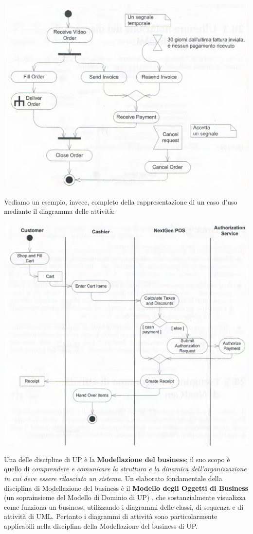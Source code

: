\documentclass[a4paper,12pt, oneside]{book}
\begin{document}
\begin{center}
	\includegraphics[scale=0.6]{img/atd6.png}
\end{center}
\newpage
Vediamo un esempio, invece, completo della rappresentazione di un caso d'uso mediante il diagramma delle attività:
\begin{center}
	\includegraphics[scale=0.7]{img/atd7.png}
\end{center} 
Una delle discipline di UP è la \textbf{Modellazione del business}; il suo scopo è quello di \textit{comprendere e comunicare la struttura e la dinamica dell'organizzazione in cui deve essere rilasciato un sistema}. Un elaborato fondamentale della disciplina di Modellazione del business è il \textbf{Modello degli Oggetti di Business} (un soprainsieme del Modello di Dominio di UP) , che sostanzialmente visualizza come funziona un business, utilizzando i diagrammi delle classi, di sequenza e di attività di UML. Pertanto i diagrammi di attività sono particolarmente applicabili nella disciplina della Modellazione del business di UP.
\end{document}
